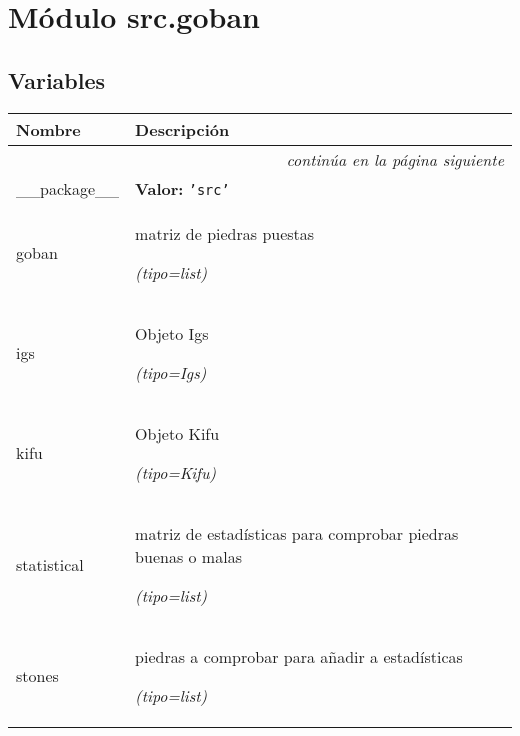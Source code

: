 %
%
%


\section{Módulo src.goban}

    \label{src:goban}


  \subsection{Variables}

    \vspace{-1cm}
\hspace{\varindent}\begin{longtable}{|p{\varnamewidth}|p{\vardescrwidth}|l}
\cline{1-2}
\cline{1-2} \centering \textbf{Nombre} & \centering \textbf{Descripción}& \\
\cline{1-2}
\endhead\cline{1-2}\multicolumn{3}{r}{\small\textit{continúa en la página siguiente}}\\\endfoot\cline{1-2}
\endlastfoot\raggedright \_\-\_\-p\-a\-c\-k\-a\-g\-e\-\_\-\_\- & \raggedright \textbf{Valor:} 
{\tt \texttt{'}\texttt{src}\texttt{'}}&\\
\cline{1-2}
\raggedright g\-o\-b\-a\-n\- & \raggedright matriz de piedras puestas

            {\it (tipo=list)}&\\
\cline{1-2}
\raggedright i\-g\-s\- & \raggedright Objeto Igs

            {\it (tipo=Igs)}&\\
\cline{1-2}
\raggedright k\-i\-f\-u\- & \raggedright Objeto Kifu

            {\it (tipo=Kifu)}&\\
\cline{1-2}
\raggedright s\-t\-a\-t\-i\-s\-t\-i\-c\-a\-l\- & \raggedright matriz de estadísticas para comprobar piedras buenas o malas

            {\it (tipo=list)}&\\
\cline{1-2}
\raggedright s\-t\-o\-n\-e\-s\- & \raggedright piedras a comprobar para añadir a estadísticas

            {\it (tipo=list)}&\\
\cline{1-2}
\end{longtable}


